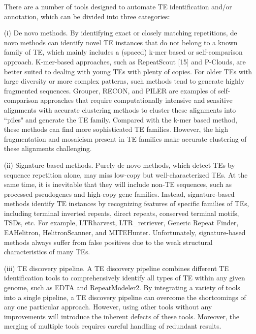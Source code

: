 \documentclass{bmcart}
\begin{document}
There are a number of tools designed to automate TE identification and/or annotation, which can be divided into three categories:

(i) De novo methods. By identifying exact or closely matching repetitions, de novo methods can identify novel TE instances that do not belong to a known family of TE, which mainly includes a (spaced) k-mer based or self-comparison approach. K-mer-based approaches, such as RepeatScout [15] and P-Clouds\cite{gu2008identification}, are better suited to dealing with young TEs with plenty of copies. For older TEs with large diversity or more complex patterns, such methods tend to generate highly fragmented sequences. Grouper\cite{quesneville2003detection}, RECON\cite{bao2002automated}, and PILER\cite{edgar2005piler} are examples of self-comparison approaches that require computationally intensive and sensitive alignments with accurate clustering methods to cluster these alignments into ``piles" and generate the TE family. Compared with the k-mer based method, these methods can find more sophisticated TE families. However, the high fragmentation and mosaicism present in TE families make accurate clustering of these alignments challenging\cite{storer2022methodologies}.

(ii) Signature-based methods. Purely de novo methods, which detect TEs by sequence repetition alone, may miss low-copy but well-characterized TEs. At the same time, it is inevitable that they will include non-TE sequences, such as processed pseudogenes and high-copy gene families. Instead, signature-based methods identify TE instances by recognizing features of specific families of TEs, including terminal inverted repeats, direct repeats, conserved terminal motifs, TSDs, etc. For example, LTRharvest\cite{ellinghaus2008ltrharvest}, LTR\_retriever\cite{ou2018ltr_retriever}, Generic Repeat Finder\cite{shi2019generic}, EAHelitron\cite{hu2019helitron}, HelitronScanner\cite{xiong2014helitronscanner}, and MITEHunter. Unfortunately, signature-based methods always suffer from false positives due to the weak structural characteristics of many TEs.

(iii) TE discovery pipeline. A TE discovery pipeline combines different TE identification tools to comprehensively identify all types of TE within any given genome, such as EDTA\cite{ou2019benchmarking} and RepeatModeler2\cite{flynn2020repeatmodeler2}. By integrating a variety of tools into a single pipeline, a TE discovery pipeline can overcome the shortcomings of any one particular approach. However, using other tools without any improvements will introduce the inherent defects of these tools. Moreover, the merging of multiple tools requires careful handling of redundant results.
\end{document}

